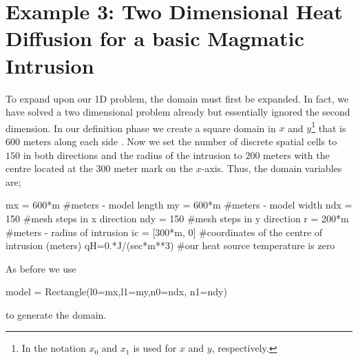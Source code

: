 \section{Example 3: Two Dimensional Heat Diffusion for a basic Magmatic
Intrusion}
\label{Sec:2DHD}

To expand upon our 1D problem, the domain must first be expanded. In fact, we
have solved a two dimensional problem already but essentially ignored the second
dimension. In our definition phase we create a square domain in $x$ and
$y$\footnote{In \esc the notation
$x_{0}$ and $x_{1}$ is used for $x$ and $y$, respectively.}
that is $600$ meters along each side . Now we set the
number of discrete spatial cells to $150$ in both directions and the radius of
the intrusion to $200$ meters with the centre located at the $300$ meter mark
on the $x$-axis. Thus, the domain variables are;
\begin{python}
mx = 600*m #meters - model length
my = 600*m #meters - model width
ndx = 150 #mesh steps in x direction 
ndy = 150 #mesh steps in y direction
r = 200*m #meters - radius of intrusion
ic = [300*m, 0] #coordinates of the centre of intrusion (meters)
qH=0.*J/(sec*m**3) #our heat source temperature is zero
\end{python}
As before we use 
\begin{python}
model = Rectangle(l0=mx,l1=my,n0=ndx, n1=ndy)
\end{python}
to generate the domain. 

